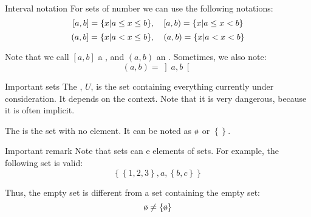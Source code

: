 \documentclass{article}
\begin{document}
\begin{parag}{Interval notation}
    For sets of number we can use the following notations: 
    \[\left[a, b\right]  = \left\{x | a \leq x \leq b\right\}, \mathspace \left[a, b\right) = \left\{x | a \leq x < b\right\}\]
    \[\left(a, b\right]  = \left\{x | a < x \leq b\right\}, \mathspace \left(a, b\right) = \left\{x | a < x < b\right\}\]
    
    Note that we call $\left[a, b\right]$ a , and $\left(a, b\right)$ an . Sometimes, we also note: 
    \[\left(a, b\right) = \left]a, b\right[ \]
\end{parag}

\begin{parag}{Important sets}
    The , $U$, is the set containing everything currently under consideration. It depends on the context. Note that it is very dangerous, because it is often implicit.

    The  is the set with no element. It can be noted as $\o$ or $\left\{\right\}$.

    \begin{subparag}{Important remark}
        Note that sets can e elements of sets. For example, the following set is valid:
        \[\left\{\left\{1, 2, 3\right\}, a, \left\{b, c\right\}\right\}\]
        
        Thus, the empty set is different from a set containing the empty set: 
        \[\o \neq \left\{\o\right\}\]
        
    \end{subparag}
\end{parag}
\end{document}
